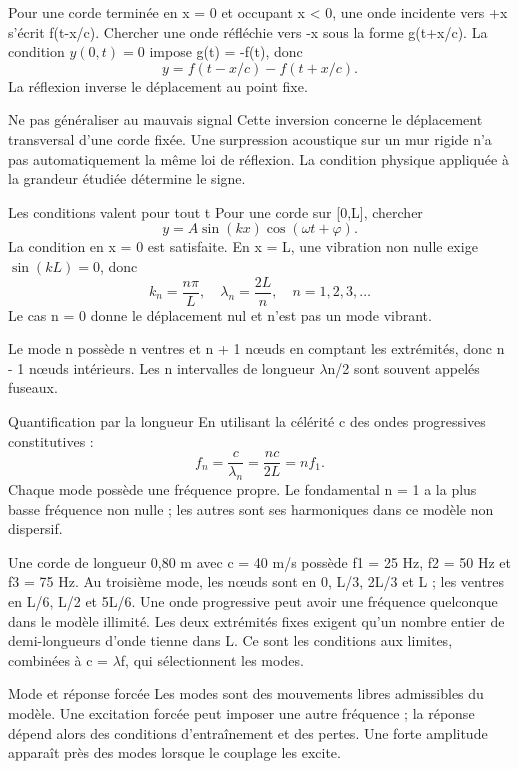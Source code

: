 Pour une corde terminée en x = 0 et occupant x < 0, une onde incidente vers +x s’écrit f(t-x/c). Chercher une onde réfléchie vers -x sous la forme g(t+x/c). La condition $y(0,t)=0$ impose g(t) = -f(t), donc\[y=f(t-x/c)-f(t+x/c).\]La réflexion inverse le déplacement au point fixe.
\begin{methode}{Ne pas généraliser au mauvais signal}
Cette inversion concerne le déplacement transversal d’une corde fixée. Une surpression acoustique sur un mur rigide n’a pas automatiquement la même loi de réflexion. La condition physique appliquée à la grandeur étudiée détermine le signe.
\end{methode}


\begin{loi}{Les conditions valent pour tout t}
Pour une corde sur [0,L], chercher\[y=A\sin(kx)\cos(\omega t+\varphi).\]La condition en x = 0 est satisfaite. En x = L, une vibration non nulle exige $\sin(kL)=0$, donc\[k_n=\frac{n\pi}{L},\quad\lambda_n=\frac{2L}{n},\quad n=1,2,3,\ldots\]Le cas n = 0 donne le déplacement nul et n’est pas un mode vibrant.
\end{loi}
Le mode n possède n ventres et n + 1 nœuds en comptant les extrémités, donc n - 1 nœuds intérieurs. Les n intervalles de longueur \ensuremath{\lambda}n/2 sont souvent appelés fuseaux.


\begin{loi}{Quantification par la longueur}
En utilisant la célérité c des ondes progressives constitutives :\[f_n=\frac c{\lambda_n}=\frac{nc}{2L}=nf_1.\]Chaque mode possède une fréquence propre. Le fondamental n = 1 a la plus basse fréquence non nulle ; les autres sont ses harmoniques dans ce modèle non dispersif.
\end{loi}
Une corde de longueur 0,80 m avec c = 40 m/s possède f1 = 25 Hz, f2 = 50 Hz et f3 = 75 Hz. Au troisième mode, les nœuds sont en 0, L/3, 2L/3 et L ; les ventres en L/6, L/2 et 5L/6.
Une onde progressive peut avoir une fréquence quelconque dans le modèle illimité. Les deux extrémités fixes exigent qu’un nombre entier de demi-longueurs d’onde tienne dans L. Ce sont les conditions aux limites, combinées à c = \ensuremath{\lambda}f, qui sélectionnent les modes.
\begin{piege}{Mode et réponse forcée}
Les modes sont des mouvements libres admissibles du modèle. Une excitation forcée peut imposer une autre fréquence ; la réponse dépend alors des conditions d’entraînement et des pertes. Une forte amplitude apparaît près des modes lorsque le couplage les excite.
\end{piege}


